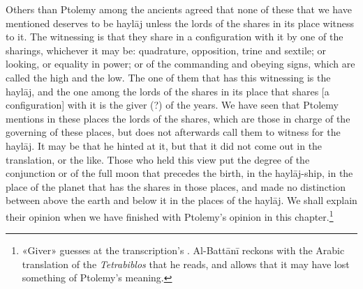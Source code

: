 \documentclass[11pt]{article}
\begin{document}
\par Others than Ptolemy among the ancients agreed that none of these that we have mentioned deserves to be haylāj unless the lords of the shares in its place witness to it. The witnessing is that they share in a configuration with it by one of the sharings, whichever it may be: quadrature, opposition, trine and sextile; or looking, or equality in power; or of the commanding and obeying signs, which are called the high and the low. The one of them that has this witnessing is the haylāj, and the one among the lords of the shares in its place that shares [a configuration] with it is the giver (?) of the years. We have seen that Ptolemy mentions in these places the lords of the shares, which are those in charge of the governing of these places, but does not afterwards call them to witness for the haylāj. It may be that he hinted at it, but that it did not come out in the translation, or the like. Those who held this view put the degree of the conjunction or of the full moon that precedes the birth, in the haylāj-ship, in the place of the planet that has the shares in those places, and made no distinction between above the earth and below it in the places of the haylāj. We shall explain their opinion when we have finished with Ptolemy's opinion in this chapter.\footnote{«Giver» guesses at the transcription's . Al-Battānī reckons with the Arabic translation of the \emph{Tetrabiblos} that he reads, and allows that it may have lost something of Ptolemy's meaning.}\par
\end{document}
